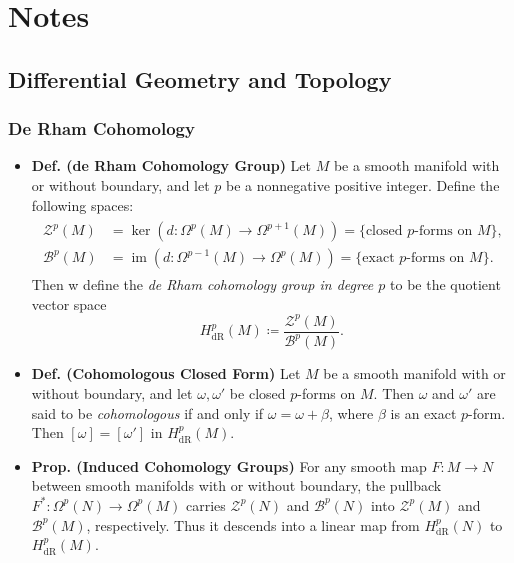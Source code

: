 \documentclass{article}
\begin{document}
	\newpage 
	\section{Notes}
	\subsection{Differential Geometry and Topology}
	\subsubsection{De Rham Cohomology}
	\begin{itemize}
		\item \textbf{Def. (de Rham Cohomology Group)} Let $M$ be a smooth manifold with or without boundary, and let $p$ be a nonnegative positive integer. Define the following spaces: 
		\begin{align*}
			\begin{split}
				\mathcal{Z}^{p}(M) &= \ker\left(d: \Omega^{p}(M) \to \Omega^{p + 1}(M)\right) = \{\text{closed $p$-forms on $M$}\}, \\
				\mathcal{B}^{p}(M) &= \operatorname{im}\left(d: \Omega^{p - 1}(M) \to \Omega^{p}(M)\right) = \{\text{exact $p$-forms on $M$}\}. 
			\end{split}
		\end{align*}
		Then w define the \textit{de Rham cohomology group in degree $p$} to be the quotient vector space 
		\begin{equation*}
			H^{p}_{\text{dR}}(M) \coloneqq \frac{\mathcal{Z}^{p}(M)}{\mathcal{B}^{p}(M)}. 
		\end{equation*}
		
		\item \textbf{Def. (Cohomologous Closed Form)} Let $M$ be a smooth manifold with or without boundary, and let $\omega, \omega'$ be closed $p$-forms on $M$. Then $\omega$ and $\omega'$ are said to be \textit{cohomologous} if and only if $\omega = \omega + \beta$, where $\beta$ is an exact $p$-form. Then $[\omega] = [\omega']$ in $H^{p}_{\text{dR}}(M)$. 
		
		\item \textbf{Prop. (Induced Cohomology Groups)} For any smooth map $F: M \to N$ between smooth manifolds with or without boundary, the pullback $F^{\ast}: \Omega^{p}(N) \to \Omega^{p}(M)$ carries $\mathcal{Z}^{p}(N)$ and $\mathcal{B}^{p}(N)$ into $\mathcal{Z}^{p}(M)$ and $\mathcal{B}^{p}(M)$, respectively. Thus it descends into a linear map from $H^{p}_{\text{dR}}(N)$ to $H^{p}_{\text{dR}}(M)$. 
		

\end{itemize}
\end{document}
